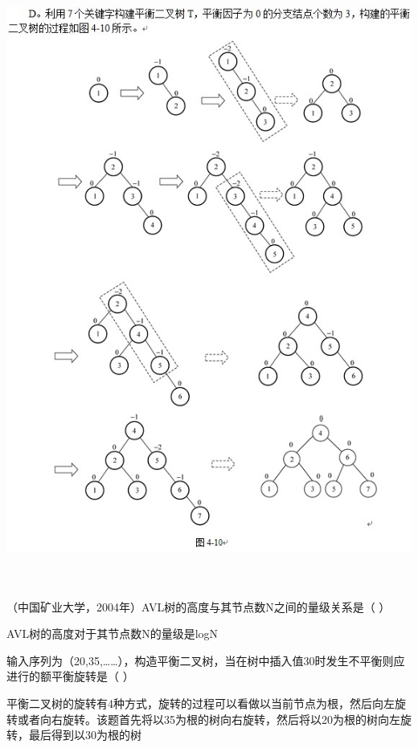 \begin{solution}\includegraphics[width=5.87500in,height=7.90625in]{computerassets/36BA3267DBB111192A90D0766834D54C.png}
\end{solution}
\question （中国矿业大学，2004年）AVL树的高度与其节点数N之间的量级关系是（ ）
\par{}
\begin{solution}AVL树的高度对于其节点数N的量级是logN
\end{solution}
\question 输入序列为（20,35,\ldots{}\ldots{}），构造平衡二叉树，当在树中插入值30时发生不平衡则应进行的额平衡旋转是（
）
\par{}
\begin{solution}平衡二叉树的旋转有4种方式，旋转的过程可以看做以当前节点为根，然后向左旋转或者向右旋转。该题首先将以35为根的树向右旋转，然后将以20为根的树向左旋转，最后得到以30为根的树
\end{solution}

